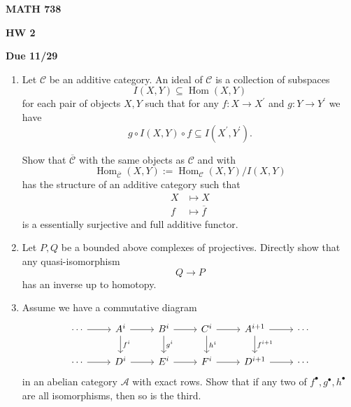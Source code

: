 \documentclass[12pt]{amsart}
\begin{document}
\centerline{\bf MATH 738}
\centerline{\bf HW 2} 
\centerline{\bf Due 11/29}

\vspace{2em}

\begin{enumerate}
    \item Let $\mathcal C$ be an additive category. An ideal of $\mathcal C$ is a collection of 
    subspaces 
    \begin{displaymath}
        I(X,Y) \subseteq \operatorname{Hom}(X,Y)
    \end{displaymath} 
    for each pair of objects $X,Y$ such that for any $f: X \to X^\prime$ and $g: Y \to Y^\prime$ 
    we have 
    \begin{displaymath}
        g \circ I(X,Y) \circ f \subseteq I(X^\prime,Y^\prime).
    \end{displaymath}

    Show that $\overline{\mathcal C}$ with the same objects as $\mathcal C$ and with 
    \begin{displaymath}
        \operatorname{Hom}_{\overline{\mathcal C}}(X,Y) := \operatorname{Hom}_{\mathcal C}(X,Y)/I(X,Y)
    \end{displaymath}
    has the structure of an additive category such that 
    \begin{align*}
        X & \mapsto X \\
        f & \mapsto \overline{f}
    \end{align*}
    is a essentially surjective and full additive functor. 

    \item Let $P,Q$ be a bounded above complexes of projectives. Directly show that any quasi-isomorphism 
    \begin{displaymath}
        Q \to P 
    \end{displaymath}
    has an inverse up to homotopy. 

    \item Assume we have a commutative diagram 
    \begin{equation*}
        \begin{tikzcd}
            \cdots \ar[r] & A^i \ar[r] \ar[d,"f^i"] & B^i \ar[r] \ar[d,"g^i"] & C^i \ar[r] \ar[d,"h^i"] & A^{i+1} \ar[r] \ar[d,"f^{i+1}"] & \cdots \\
            \cdots \ar[r] & D^i \ar[r] & E^i \ar[r] & F^i \ar[r] & D^{i+1} \ar[r] & \cdots
        \end{tikzcd}
    \end{equation*}
    in an abelian category $\mathcal A$ with exact rows. Show that if any two of $f^\bullet, g^\bullet, h^\bullet$ are all isomorphisms, then so is the third. 
    

\end{enumerate}
\end{document}
